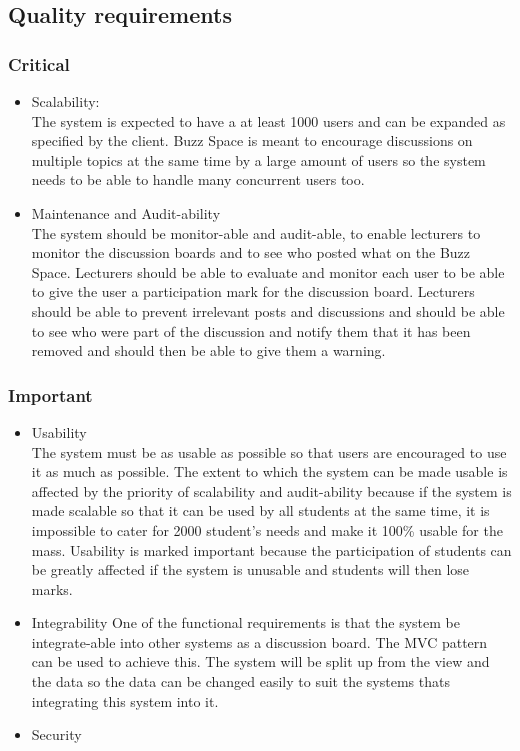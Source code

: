 
\subsection{Quality requirements}
	\subsubsection{Critical}
		\begin{itemize}
			\item Scalability: \\
			The system is expected to have a at least 1000 users and can be expanded as specified by the client. Buzz Space is meant to encourage discussions on multiple topics at the same time by a large amount of users so the system needs to be able to handle many concurrent users too.
			\item Maintenance and Audit-ability \\
			The system should be monitor-able and audit-able, to enable lecturers to monitor the discussion boards and to see who posted what on the Buzz Space. Lecturers should be able to evaluate and monitor each user to be able to give the user a participation mark for the discussion board. Lecturers should be able to prevent irrelevant posts and discussions and should be able to see who were part of the discussion and notify them that it has been removed and should then be able to give them a warning.
		\end{itemize}
	\subsubsection{Important}
		\begin{itemize}
			\item Usability \\
			The system must be as usable as possible so that users are encouraged to use it as much as possible. The extent to which the system can be made usable is affected by the priority of scalability and audit-ability because if the system is made scalable so that it can be used by all students at the same time, it is impossible to cater for 2000 student's needs and make it 100\% usable for the mass. Usability is marked important because the participation of students can be greatly affected if the system is unusable and students will then lose marks.

			\item Integrability
			One of the functional requirements is that the system be integrate-able into other systems as a discussion board. The MVC pattern can be used to achieve this. The system will be split up from the view and the data so the data can be changed easily to suit the systems thats integrating this system into it.
			
			\item Security
		\end{itemize}